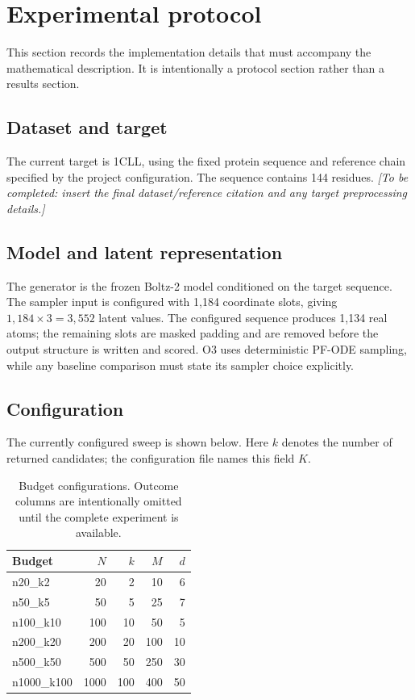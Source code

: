 \documentclass[11pt]{article}
\newcommand{\TODO}[1]{\textit{[To be completed: #1]}}
\begin{document}
\section{Experimental protocol}
\label{sec:protocol}

This section records the implementation details that must accompany the
mathematical description.  It is intentionally a protocol section rather than
a results section.

\subsection{Dataset and target}

The current target is 1CLL, using the fixed protein sequence and reference
chain specified by the project configuration.  The sequence contains 144
residues.  \TODO{insert the final dataset/reference citation and any target
preprocessing details.}

\subsection{Model and latent representation}

The generator is the frozen Boltz-2 model conditioned on the target sequence.
The sampler input is configured with 1,184 coordinate slots, giving
\(1{,}184\times3=3{,}552\) latent values.  The configured sequence produces
1,134 real atoms; the remaining slots are masked padding and are removed before
the output structure is written and scored.  O3 uses deterministic PF-ODE
sampling, while any baseline comparison must state its sampler choice
explicitly.

\subsection{Configuration}

The currently configured sweep is shown below.  Here \(k\) denotes the number
of returned candidates; the configuration file names this field \(K\).

\begin{table}[ht]
    \centering
    \caption{Budget configurations.  Outcome columns are intentionally omitted
    until the complete experiment is available.}
    \label{tab:budgets}
    \begin{tabular}{@{}lrrrr@{}}
        \toprule
        Budget & \(N\) & \(k\) & \(M\) & \(d\) \\
        \midrule
        n20\_k2     & 20   & 2   & 10  & 6  \\
        n50\_k5     & 50   & 5   & 25  & 7  \\
        n100\_k10   & 100  & 10  & 50  & 5  \\
        n200\_k20   & 200  & 20  & 100 & 10 \\
        n500\_k50   & 500  & 50  & 250 & 30 \\
        n1000\_k100 & 1000 & 100 & 400 & 50 \\
        \bottomrule
    \end{tabular}
\end{table}
\end{document}
